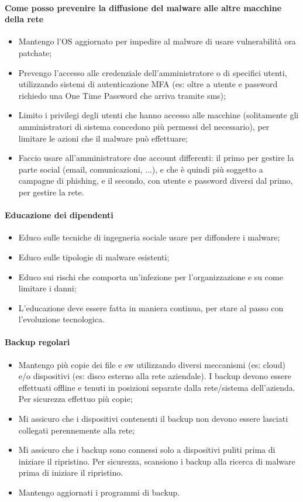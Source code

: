 \paragraph{Come posso prevenire la diffusione del malware alle altre macchine della rete}
\begin{itemize}
    \item Mantengo l'OS aggiornato per impedire al malware di usare vulnerabilità ora patchate;
    \item Prevengo l'accesso alle credenziale dell'amministratore o di specifici utenti, utilizzando sistemi di autenticazione MFA (es: oltre a utente e password richiedo una One Time Password che arriva tramite sms);
    \item Limito i privilegi degli utenti che hanno accesso alle macchine (solitamente gli amministratori di sistema concedono più permessi del necessario), per limitare le azioni che il malware può effettuare;
    \item Faccio usare all'amministratore due account differenti: il primo per gestire la parte social (email, comunicazioni, ...), e che è quindi più soggetto a campagne di phishing, e il secondo, con utente e password diversi dal primo, per gestire la rete.
\end{itemize}

\paragraph{Educazione dei dipendenti}
\begin{itemize}
    \item Educo sulle tecniche di ingegneria sociale usare per diffondere i malware;
    \item Educo sulle tipologie di malware esistenti;
    \item Educo sui rischi che comporta un'infezione per l'organizzazione e su come limitare i danni;
    \item L'educazione deve essere fatta in maniera continua, per stare al passo con l'evoluzione tecnologica.
\end{itemize}

\paragraph{Backup regolari}
\begin{itemize}
    \item Mantengo più copie dei file e sw utilizzando diversi meccanismi (es: cloud) e/o dispositivi (es: disco esterno alla rete aziendale). I backup devono essere effettuati offline e tenuti in posizioni separate dalla rete/sistema dell'azienda. Per sicurezza effettuo più copie;
    \item Mi assicuro che i dispositivi contenenti il backup non devono essere lasciati collegati perennemente alla rete;
    \item Mi assicuro che i backup sono connessi solo a dispositivi puliti prima di iniziare il ripristino. Per sicurezza, scansiono i backup alla ricerca di malware prima di iniziare il ripristino.
    \item Mantengo aggiornati i programmi di backup.
\end{itemize}

